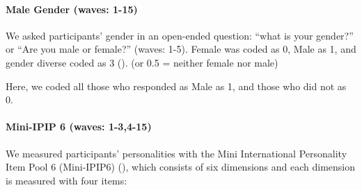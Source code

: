 \documentclass[
  single column]{article}
\let\oldparagraph\paragraph
\renewcommand{\paragraph}[1]{\oldparagraph{#1}\mbox{}}
\begin{document}
\paragraph{Male Gender (waves: 1-15)}\label{male-gender-waves-1-15}

We asked participants' gender in an open-ended question: ``what is your
gender?'' or ``Are you male or female?'' (waves: 1-5). Female was coded
as 0, Male as 1, and gender diverse coded as 3
(). (or 0.5
= neither female nor male)

Here, we coded all those who responded as Male as 1, and those who did
not as 0.

\paragraph{Mini-IPIP 6 (waves:
1-3,4-15)}\label{mini-ipip-6-waves-1-34-15}

We measured participants' personalities with the Mini International
Personality Item Pool 6 (Mini-IPIP6) (), which consists of six dimensions and each
dimension is measured with four items:
\end{document}
